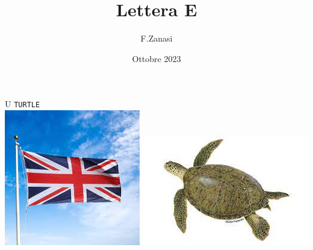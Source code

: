 \documentclass[]{article}
\title{Lettera E}
\author{F.Zanasi}
\date{Ottobre 2023}
\begin{document}
{\fontsize{150}{160}\selectfont U} 
\hspace{2.0in}
{\fontsize{80}{80}\color{black}\texttt{T}\color{blue}\texttt{U}\color{black}\texttt{RTLE}} 
\\[1cm]
\includegraphics[scale=0.3]{flag-UK}
\includegraphics[scale=0.4]{turtle}
\end{document}
